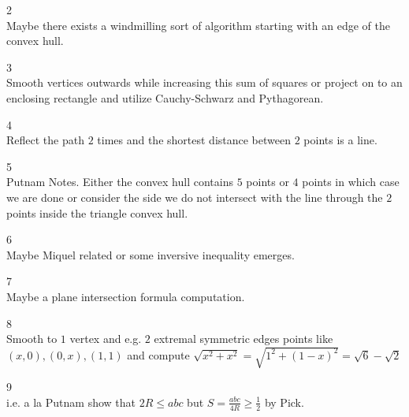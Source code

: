 2 \\
Maybe there exists a windmilling sort of algorithm starting with an edge of the convex hull.

3 \\
Smooth vertices outwards while increasing this sum of squares or project on to an enclosing rectangle and utilize Cauchy-Schwarz and Pythagorean.

4 \\
Reflect the path $2$ times and the shortest distance between $2$ points is a line.

5 \\
Putnam Notes. Either the convex hull contains $5$ points or $4$ points in which case we are done or consider the side we do not intersect with the line through the $2$ points inside the triangle convex hull.

6 \\
Maybe Miquel related or some inversive inequality emerges.

7 \\
Maybe a plane intersection formula computation.

8 \\
Smooth to $1$ vertex and e.g. $2$ extremal symmetric edges points like $(x,0),(0,x),(1,1)$ and compute $\sqrt{x^2+x^2}=\sqrt{1^2+(1-x)^2}=\boxed{\sqrt{6}-\sqrt{2}}$

9 \\
i.e. a la Putnam show that $2R \le abc$ but $S=\frac{abc}{4R}\ge \frac{1}{2}$ by Pick.
